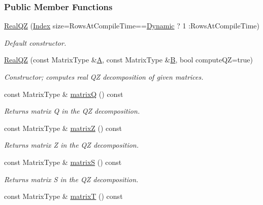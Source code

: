 \subsubsection*{Public Member Functions}
\begin{DoxyCompactItemize}
\item 
\hyperlink{group___eigenvalues___module_ad8fb9235870a8361a2fdd8dcc2e80d01}{Real\+QZ} (\hyperlink{group___eigenvalues___module_a6201e534e901b5f4e66f72c176b534a3}{Index} size=Rows\+At\+Compile\+Time==\hyperlink{namespace_eigen_ad81fa7195215a0ce30017dfac309f0b2}{Dynamic} ? 1 \+:Rows\+At\+Compile\+Time)
\begin{DoxyCompactList}\small\item\em Default constructor. \end{DoxyCompactList}\item 
\hyperlink{group___eigenvalues___module_ac6e41c839f8dae31c9a3906ea7540119}{Real\+QZ} (const Matrix\+Type \&\hyperlink{group___core___module_class_eigen_1_1_matrix}{A}, const Matrix\+Type \&\hyperlink{group___core___module_class_eigen_1_1_matrix}{B}, bool compute\+QZ=true)
\begin{DoxyCompactList}\small\item\em Constructor; computes real QZ decomposition of given matrices. \end{DoxyCompactList}\item 
const Matrix\+Type \& \hyperlink{group___eigenvalues___module_a212bc2f69ea4eff830fde70e209e40fb}{matrixQ} () const
\begin{DoxyCompactList}\small\item\em Returns matrix Q in the QZ decomposition. \end{DoxyCompactList}\item 
const Matrix\+Type \& \hyperlink{group___eigenvalues___module_a19a116383f11423179b4d8f316da6f67}{matrixZ} () const
\begin{DoxyCompactList}\small\item\em Returns matrix Z in the QZ decomposition. \end{DoxyCompactList}\item 
const Matrix\+Type \& \hyperlink{group___eigenvalues___module_ad24d7bf534afb55adaef00f00846adaf}{matrixS} () const
\begin{DoxyCompactList}\small\item\em Returns matrix S in the QZ decomposition. \end{DoxyCompactList}\item 
const Matrix\+Type \& \hyperlink{group___eigenvalues___module_a8dc963d8ea2a17df9d8d718e9e34d06f}{matrixT} () const

\end{DoxyCompactItemize}
